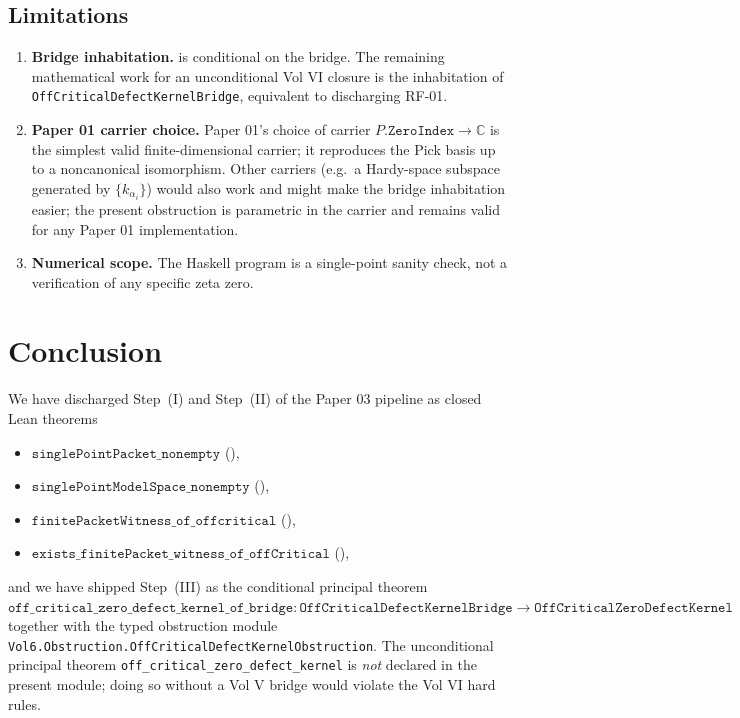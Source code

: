 \documentclass[12pt]{article}
\theoremstyle{definition}
\theoremstyle{remark}
\newcommand{\C}{\mathbb{C}}
\begin{document}
\subsection{Limitations}

\begin{enumerate}
\item \textbf{Bridge inhabitation.}  is
conditional on the bridge. The remaining mathematical work for an
unconditional Vol VI closure is the inhabitation of
\texttt{OffCriticalDefectKernelBridge}, equivalent to discharging RF-01.
\item \textbf{Paper 01 carrier choice.} Paper 01's choice of carrier
$P.\texttt{ZeroIndex}\to\C$ is the simplest valid finite-dimensional
carrier; it reproduces the Pick basis up to a noncanonical isomorphism.
Other carriers (e.g.\ a Hardy-space subspace generated by
$\{k_{\alpha_{i}}\}$) would also work and might make the bridge
inhabitation easier; the present obstruction is parametric in the carrier
and remains valid for any Paper 01 implementation.
\item \textbf{Numerical scope.} The Haskell program is a single-point
sanity check, not a verification of any specific zeta zero.
\end{enumerate}

\section{Conclusion}\label{sec:conclusion}

We have discharged Step~(I) and Step~(II) of the Paper 03 pipeline as
closed Lean theorems
\begin{itemize}
\item $\texttt{singlePointPacket\_nonempty}$
   (),
\item $\texttt{singlePointModelSpace\_nonempty}$
   (),
\item $\texttt{finitePacketWitness\_of\_offcritical}$
   (),
\item $\texttt{exists\_finitePacket\_witness\_of\_offCritical}$
   (),
\end{itemize}
and we have shipped Step~(III) as the conditional principal theorem
\(
\texttt{off\_critical\_zero\_defect\_kernel\_of\_bridge}
:
\texttt{OffCriticalDefectKernelBridge}\to
\texttt{OffCriticalZeroDefectKernel}
\)
together with the typed obstruction module
\texttt{Vol6.Obstruction.OffCriticalDefectKernelObstruction}. The
unconditional principal theorem
\texttt{off\_critical\_zero\_defect\_kernel} is \emph{not} declared in
the present module; doing so without a Vol V bridge would violate the
Vol VI hard rules.
\end{document}
